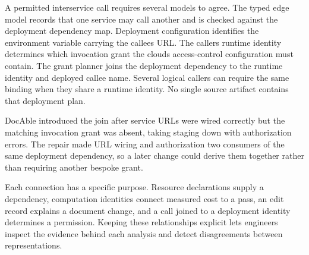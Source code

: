 
A permitted interservice call requires several models to agree. The typed edge model records that one service may call another and is checked against the deployment dependency map. Deployment configuration identifies the environment variable carrying the callee\textquotesingle s URL. The caller\textquotesingle s runtime identity determines which invocation grant the cloud\textquotesingle s access-control configuration must contain. The grant planner joins the deployment dependency to the runtime identity and deployed callee name. Several logical callers can require the same binding when they share a runtime identity. No single source artifact contains that deployment plan.

DocAble introduced the join after service URLs were wired correctly but the matching invocation grant was absent, taking staging down with authorization errors. The repair made URL wiring and authorization two consumers of the same deployment dependency, so a later change could derive them together rather than requiring another bespoke grant.

Each connection has a specific purpose. Resource declarations supply a dependency, computation identities connect measured cost to a pass, an edit record explains a document change, and a call joined to a deployment identity determines a permission. Keeping these relationships explicit lets engineers inspect the evidence behind each analysis and detect disagreements between representations.
